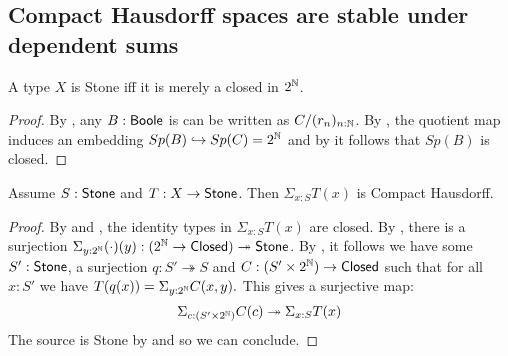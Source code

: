 \subsection{Compact Hausdorff spaces are stable under dependent sums}

\begin{lemma}\label{StoneAsClosedSubsetOfCantor}
A type $X$ is Stone iff it is merely a closed in $2^{\mathbb{N}}$.
\end{lemma}
\begin{proof}
  By , any $B:\mathsf{Boole}$ is can be written as $C/(r_n)_{n:\mathbb{N}}$.
  By , the quotient map induces an embedding $Sp(B)\hookrightarrow Sp(C)= 2^{\mathbb{N}}$
  and by  it follows that $Sp(B)$ is closed. 
\end{proof}

%

\begin{lemma}\label{SigmaStoneCompactHausdorff}
Assume $S:\mathsf{Stone}$ and $T:X\to \mathsf{Stone}$. Then $\Sigma_{x:S}T(x)$ is Compact Hausdorff.
\end{lemma}

\begin{proof}
  By  and , the identity types in $\Sigma_{x:S}T(x)$ are closed.
  By , there is a surjection 
  $\Sigma_{y:2^{\mathbb{N}}}(\cdot)(y):(2^{\mathbb{N}} \to \mathsf{Closed}) \twoheadrightarrow \mathsf{Stone}$. 
  By , it follows we have some $S':\mathsf{Stone}$, a surjection $q:S'\twoheadrightarrow S$ and 
%
$ C : (S'\times 2^{\mathbb{N}})\to\mathsf{Closed}$
such that for all $x:S'$ we have 
$T(q(x)) = \Sigma_{y:2^{\mathbb{N}}}C(x,y).$
This gives a surjective map:
$$ \Sigma_{c:(S'\times 2^{\mathbb{N}})}C(c)\twoheadrightarrow \Sigma_{x:S}T(x)$$
The source is Stone by  and  so we can conclude.
\end{proof}

